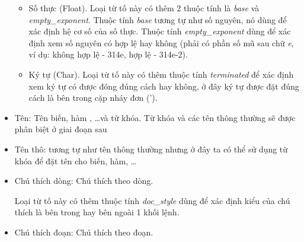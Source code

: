 \begin{itemize}
\begin{itemize}
      \item Số thực (Float). Loại từ tố này có thêm 2 thuộc tính là \textit{base} và \\\textit{empty\_exponent}. Thuộc tính \textit{base} tương tự như số nguyên, nó dùng để xác định hệ cơ số của số thực. Thuộc tính \textit{empty\_exponent} dùng để xác định xem số nguyên có hợp lệ hay không (phải có phần số mũ sau chữ \textit{e}, ví dụ: không hợp lệ - 314e, hợp lệ - 314e-2).
      \item Ký tự (Char). Loại từ tố này có thêm thuộc tính \textit{terminated} để xác định xem ký tự có được đóng đúng cách hay không, ở đây ký tự được đặt đúng cách là bên trong cặp nháy đơn (').
      
    \end{itemize}
  \item Tên: Tên biến, hàm , \dots\space và từ khóa. Từ khóa và các tên thông thường sẽ được phân biệt ở giai đoạn sau
        
        
  \item Tên thô: tương tự như tên thông thường nhưng ở đây ta có thể sử dụng từ khóa để đặt tên cho biến, hàm, \dots
        
        
  \item Chú thích dòng: Chú thích theo dòng. 
        

        Loại từ tố này có thêm thuộc tính \textit{doc\_style} dùng để xác định kiểu của chú thích là bên trong hay bên ngoài 1 khối lệnh.
  \item Chú thích đoạn:  Chú thích theo đoạn. 


\end{itemize}
